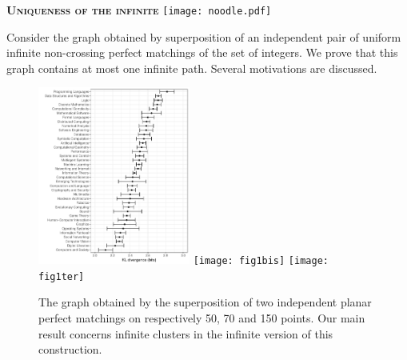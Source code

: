 \documentclass[12pt]{amsart}
\author[N. Curien]{Nicolas Curien}
\author[G. Kozma]{Gady Kozma}
\author[V. Sidoravicius]{Vladas Sidoravicius}
\author[L. Tournier]{Laurent Tournier}
\title{}
\theoremstyle{remark}
\begin{document}
\begin{center}
\Large \textbf{ \textsc{Uniqueness of the infinite}}  \texttt{[image: noodle.pdf]}
\end{center}
\maketitle



{\footnotesize {} 
Consider the graph obtained by superposition of an independent pair of uniform infinite non-crossing perfect matchings of the set of integers. We prove that this graph contains at most one infinite path. Several motivations are discussed.} 

\begin{figure}[!h]
 \begin{center}
 \includegraphics[width=5cm]{fig1} \hspace{1cm}
  \texttt{[image: fig1bis]} \hspace{1cm}
  \texttt{[image: fig1ter]}
 \caption{ \label{fig:intro}	The graph obtained by the superposition of two independent planar perfect matchings on respectively 50, 70 and 150 points. Our main result concerns infinite clusters in the infinite version of this construction.}
 \end{center}
 \end{figure}
\end{document}
